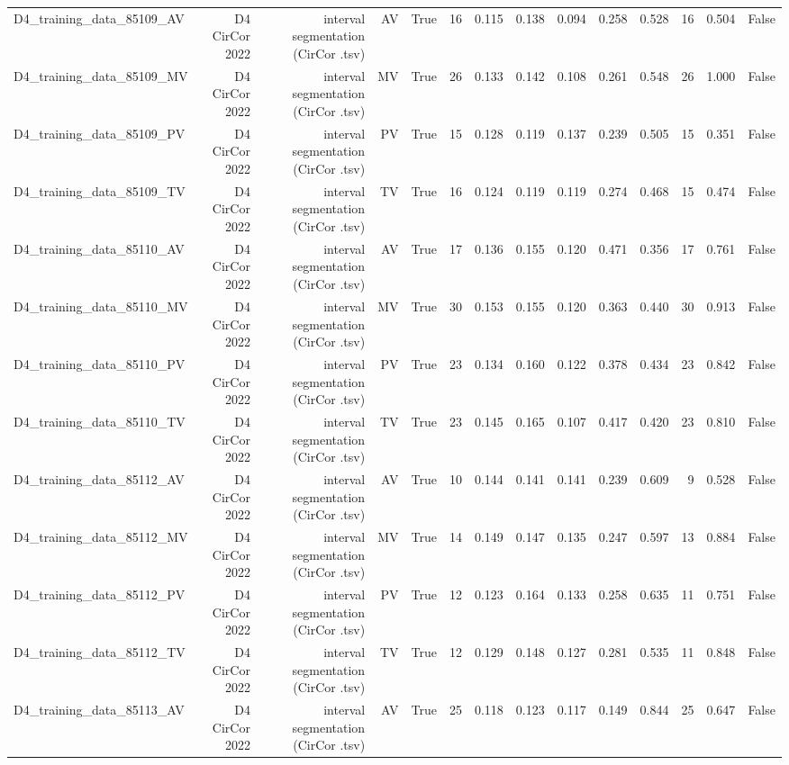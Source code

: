 \begin{table}[htbp]
\begin{tabular}{lrrrrrrrrrrrrr}
    D4\_training\_data\_85109\_AV & D4 CirCor 2022 & interval segmentation (CirCor .tsv) & AV & True & 16 & 0.115 & 0.138 & 0.094 & 0.258 & 0.528 & 16 & 0.504 & False \\
    D4\_training\_data\_85109\_MV & D4 CirCor 2022 & interval segmentation (CirCor .tsv) & MV & True & 26 & 0.133 & 0.142 & 0.108 & 0.261 & 0.548 & 26 & 1.000 & False \\
    D4\_training\_data\_85109\_PV & D4 CirCor 2022 & interval segmentation (CirCor .tsv) & PV & True & 15 & 0.128 & 0.119 & 0.137 & 0.239 & 0.505 & 15 & 0.351 & False \\
    D4\_training\_data\_85109\_TV & D4 CirCor 2022 & interval segmentation (CirCor .tsv) & TV & True & 16 & 0.124 & 0.119 & 0.119 & 0.274 & 0.468 & 15 & 0.474 & False \\
    D4\_training\_data\_85110\_AV & D4 CirCor 2022 & interval segmentation (CirCor .tsv) & AV & True & 17 & 0.136 & 0.155 & 0.120 & 0.471 & 0.356 & 17 & 0.761 & False \\
    D4\_training\_data\_85110\_MV & D4 CirCor 2022 & interval segmentation (CirCor .tsv) & MV & True & 30 & 0.153 & 0.155 & 0.120 & 0.363 & 0.440 & 30 & 0.913 & False \\
    D4\_training\_data\_85110\_PV & D4 CirCor 2022 & interval segmentation (CirCor .tsv) & PV & True & 23 & 0.134 & 0.160 & 0.122 & 0.378 & 0.434 & 23 & 0.842 & False \\
    D4\_training\_data\_85110\_TV & D4 CirCor 2022 & interval segmentation (CirCor .tsv) & TV & True & 23 & 0.145 & 0.165 & 0.107 & 0.417 & 0.420 & 23 & 0.810 & False \\
    D4\_training\_data\_85112\_AV & D4 CirCor 2022 & interval segmentation (CirCor .tsv) & AV & True & 10 & 0.144 & 0.141 & 0.141 & 0.239 & 0.609 & 9 & 0.528 & False \\
    D4\_training\_data\_85112\_MV & D4 CirCor 2022 & interval segmentation (CirCor .tsv) & MV & True & 14 & 0.149 & 0.147 & 0.135 & 0.247 & 0.597 & 13 & 0.884 & False \\
    D4\_training\_data\_85112\_PV & D4 CirCor 2022 & interval segmentation (CirCor .tsv) & PV & True & 12 & 0.123 & 0.164 & 0.133 & 0.258 & 0.635 & 11 & 0.751 & False \\
    D4\_training\_data\_85112\_TV & D4 CirCor 2022 & interval segmentation (CirCor .tsv) & TV & True & 12 & 0.129 & 0.148 & 0.127 & 0.281 & 0.535 & 11 & 0.848 & False \\
    D4\_training\_data\_85113\_AV & D4 CirCor 2022 & interval segmentation (CirCor .tsv) & AV & True & 25 & 0.118 & 0.123 & 0.117 & 0.149 & 0.844 & 25 & 0.647 & False \\

\end{tabular}
\end{table}
